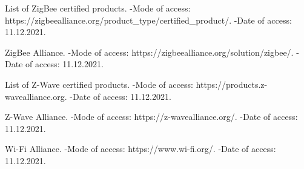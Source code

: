 \newpage
 	
	 \begin{thebibliography}{1}
	 	
	 	 List of ZigBee certified products. -Mode of access: 
	 	\newline https://zigbeealliance.org/product\_type/certified\_product/. -Date of access: 11.12.2021.
	 	
	 	 ZigBee Alliance. -Mode of access: 
	 	\newline https://zigbeealliance.org/solution/zigbee/. -Date of access: 11.12.2021.
	 	
	 	 List of Z-Wave certified products. -Mode of access: 
	 	\newline https://products.z-wavealliance.org. -Date of access: 11.12.2021.
	 	
	 	 Z-Wave Alliance. -Mode of access: 
	 	\newline https://z-wavealliance.org/. -Date of access: 11.12.2021.
	 	
	 	 Wi-Fi Alliance. -Mode of access: 
	 	\newline https://www.wi-fi.org/. -Date of access: 11.12.2021.
	 	
	 \end{thebibliography}
